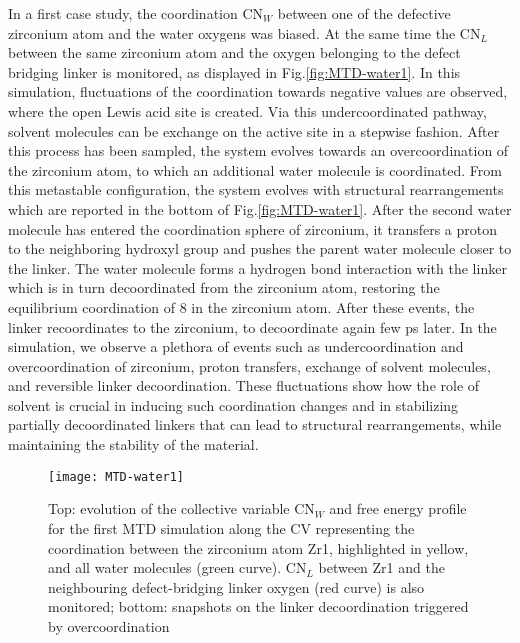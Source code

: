 In a first case study, the coordination CN$_W$ between one of the defective zirconium atom and the water oxygens was biased. At the same time the CN$_L$ between the same zirconium atom and the oxygen belonging to the defect bridging linker is monitored, as displayed in Fig.\ref{fig:MTD-water1}. In this simulation, fluctuations of the coordination towards negative values are observed, where the open Lewis acid site is created. Via this undercoordinated pathway, solvent molecules can be exchange on the active site in a stepwise fashion. After this process has been sampled, the system evolves towards an overcoordination of the zirconium atom, to which an additional water molecule is coordinated. From this metastable configuration, the system evolves with structural rearrangements which are reported in the bottom of Fig.\ref{fig:MTD-water1}. After the second water molecule has entered the coordination sphere of zirconium, it transfers a proton to the neighboring hydroxyl group and pushes the parent water molecule closer to the linker. The water molecule forms a hydrogen bond interaction with the linker which is in turn decoordinated from the zirconium atom, restoring the equilibrium coordination of 8 in the zirconium atom. After these events, the linker recoordinates to the zirconium, to decoordinate again few ps later. In the simulation, we observe a plethora of events such as undercoordination and overcoordination of zirconium, proton transfers, exchange of solvent molecules, and reversible linker decoordination. These fluctuations show how the role of solvent is crucial in inducing such coordination changes and in stabilizing partially decoordinated linkers that can lead to structural rearrangements, while maintaining the stability of the material. 
\npar
\begin{figure}[!htbp]
	\centering
	\texttt{[image: MTD-water1]}
	\caption{Top: evolution of the collective variable CN$_W$ and free energy profile for the first MTD simulation along the CV representing the coordination between the zirconium atom Zr1, highlighted in yellow, and all water molecules (green curve). CN$_L$ between Zr1 and the neighbouring defect-bridging linker oxygen (red curve) is also monitored; bottom: snapshots on the linker decoordination triggered by overcoordination}
	\label{fig: MTD-water1}
\end{figure}
